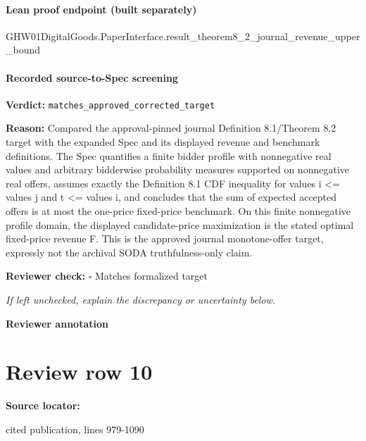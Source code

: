 \documentclass[10pt]{article}
\newcommand{\reviewerbox}{%
  \par\noindent\fbox{\parbox{0.96\linewidth}{\rule{0pt}{0.38in}}}\par
}
\newcommand{\reviewmatch}[1]{%
  \par\noindent\textbf{Reviewer check:} $\square$\; #1\par
  \noindent\emph{If left unchecked, explain the discrepancy or uncertainty below.}\par
}
\begin{document}
\paragraph{Lean proof endpoint (built separately)}\begin{ReviewVerbatim}
GHW01DigitalGoods.PaperInterface.result_theorem8_2_journal_revenue_upper_bound
\end{ReviewVerbatim}

\paragraph{Recorded source-to-Spec screening}
\textbf{Verdict:} \texttt{matches\_approved\_corrected\_target}
\\
{\raggedright
\textbf{Reason:} Compared the approval-\allowbreak{}pinned journal Definition 8.\allowbreak{}1/\allowbreak{}Theorem 8.\allowbreak{}2 target with the expanded Spec and its displayed revenue and benchmark definitions.\allowbreak{} The Spec quantifies a finite bidder profile with nonnegative real values and arbitrary bidderwise probability measures supported on nonnegative real offers, assumes exactly the Definition 8.\allowbreak{}1 CDF inequality for values i <= values j and t <= values i, and concludes that the sum of expected accepted offers is at most the one-\allowbreak{}price fixed-\allowbreak{}price benchmark.\allowbreak{} On this finite nonnegative profile domain, the displayed candidate-\allowbreak{}price maximization is the stated optimal fixed-\allowbreak{}price revenue F.\allowbreak{} This is the approved journal monotone-\allowbreak{}offer target, expressly not the archival SODA truthfulness-\allowbreak{}only claim.\allowbreak{}
\par}
\reviewmatch{Matches formalized target}
\noindent\textbf{Reviewer annotation}\par
\reviewerbox
\clearpage
\hypertarget{source-claim-2aeebcaf889368d8}{}
\section*{Review row 10}
\textbf{Source locator:} {\footnotesize\raggedright cited publication, lines 979-\allowbreak{}1090\par}
\end{document}
